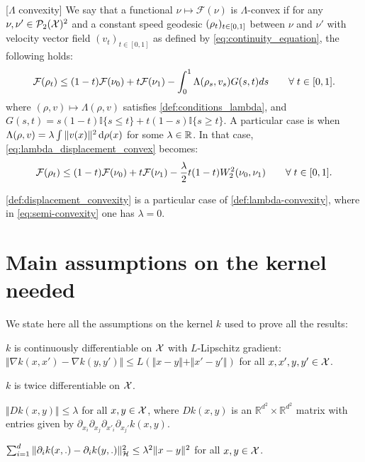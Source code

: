 \begin{definition}\label{def:lambda-convexity}[$\Lambda$ convexity]
	We say that a functional $\nu\mapsto\mathcal{F}(\nu)$ is $\Lambda$-convex
	if for any $\nu,\nu'\in \mathcal{P}_2({{\mathcal X}})^2$ and a constant speed geodesic $(\text{\ensuremath{\rho_{t}}})_{t \in [0,1]}$
	between $\nu$ and $\nu'$ with velocity vector field $(v_{t})_{t \in [0,1]}$ as defined by \cref{eq:continuity_equation},
	the following holds:
	\begin{equation}\label{eq:lambda_displacement_convex}
		{{\mathcal F}}(\rho_{t})\leq(1-t){{\mathcal F}}(\nu_{0})+t{{\mathcal F}}(\nu_{1})-\int_{0}^{1}\Lambda(\rho_{s},v_{s})G(s,t)ds \qquad\forall\; t\in[0,1].
	\end{equation}
	where $(\rho,v)\mapsto\Lambda(\rho,v)$ satisfies \cref{def:conditions_lambda},
	and $G(s,t)=s(1-t) \mathbb{I}\{s\leq t\}
	+t(1-s) \mathbb{I}\{s\geq t\}$.
	A particular case is when $\Lambda(\rho,v)= \lambda \int \Vert v(x) \Vert^2 \mathop{}\!\mathrm{d} \rho(x)   $ for some $\lambda\in {{\mathbb R}}$. In that case, \cref{eq:lambda_displacement_convex} becomes:
\begin{align}\label{eq:semi-convexity}
	{{\mathcal F}}(\rho_{t})\leq(1-t){{\mathcal F}}(\nu_{0})+t{{\mathcal F}}(\nu_{1})-\frac{\lambda}{2}t(1-t)W_2^2(\nu_0,\nu_1)  \qquad\forall\; t\in[0,1].
\end{align}
\end{definition}
\cref{def:displacement_convexity} is a particular case of \cref{def:lambda-convexity}, where in \cref{eq:semi-convexity} one has $\lambda =0$.


\section{Main assumptions on the kernel needed}\label{sec:assumptions_kernel}

We state here all the assumptions on the kernel $k$ used to prove all the results:%
\begin{assumplist}
	\item \label{assump:lipschitz_gradient_k} $k$ is continuously differentiable on ${{\mathcal X}}$ with $L$-Lipschitz gradient: $\Vert  \nabla k(x,x') - \nabla k(y,y')\Vert \leq L(\Vert  x-y\Vert + \Vert x'-y' \Vert ) $ for all $x,x',y,y' \in {{\mathcal X}}$.
	\item \label{assump:diff_kernel} $k$ is twice differentiable on ${{\mathcal X}}$.
	\item \label{assump:bounded_fourth_oder} $\Vert Dk(x,y) \Vert\leq \lambda  $ for all $x,y\in {{\mathcal X}}$, where $Dk(x,y)$ is an $\mathbb{R}^{d^2}\times \mathbb{R}^{d^2}$ matrix with entries given by $\partial_{x_{i}}\partial_{x_{j}}\partial_{x'_{i}}\partial_{x_{j}'}k(x,y)$.
	\item \label{assump:Lipschitz_grad_rkhs} $ \sum_{i=1}^d\Vert  \partial_i k(x,.) - \partial_i k(y,.)\Vert^2_{{{\mathcal H}}} \leq \lambda^2 \Vert  x-y\Vert^2 $ for all $x,y\in {{\mathcal X}}$.

\end{assumplist}

